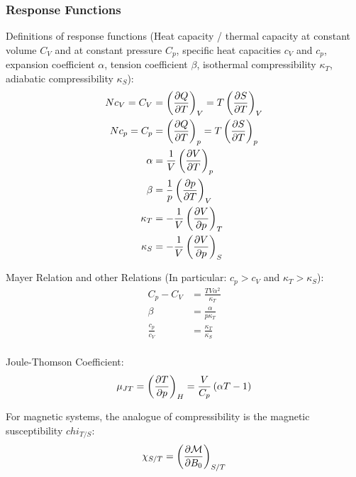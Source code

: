 		\subsubsection{Response Functions}
			\noindent
			Definitions of response functions (Heat capacity / thermal capacity at constant volume $C_V$ and at constant pressure $C_p$, specific heat capacities $c_V$ and $c_p$, expansion coefficient $\alpha$, tension coefficient $\beta$, isothermal compressibility $\kappa_T$, adiabatic compressibility $\kappa_S$):
			\begin{equation}
				\begin{aligned}
					N c_V = C_V &= \left( \pdv{Q}{T} \right)_V = T \left( \pdv{S}{T} \right)_V \\
					N c_p = C_p &= \left( \pdv{Q}{T} \right)_p = T \left( \pdv{S}{T} \right)_p \\
					\alpha &= \frac{1}{V} \left( \pdv{V}{T} \right)_p \\
					\beta &= \frac{1}{p} \left( \pdv{p}{T} \right)_V \\
					\kappa_T &= -\frac{1}{V} \left( \pdv{V}{p} \right)_T \\
					\kappa_S &= -\frac{1}{V} \left( \pdv{V}{p} \right)_S \\
				\end{aligned}
			\end{equation}

			\noindent
			Mayer Relation and other Relations  (In particular: $c_p > c_V$ and $\kappa_T > \kappa_S$):
			\begin{equation}
				\begin{aligned}
					C_p - C_V &= \frac{TV\alpha^2}{\kappa_T} \\
					\beta &= \frac{\alpha}{p \kappa_T} \\
					\frac{c_p}{c_V} &= \frac{\kappa_T}{\kappa_S} \\
				\end{aligned}
			\end{equation}

			\noindent
			Joule-Thomson Coefficient:
			\begin{equation}
				\mu_{JT} = \left( \pdv{T}{p} \right)_H = \frac{V}{C_p}\left(\alpha T - 1\right)
			\end{equation}

			\noindent
			For magnetic systems, the analogue of compressibility is the magnetic susceptibility $chi_{T/S}$:
			\begin{equation}
				\chi_{S/T} = \left(\pdv{\mathcal{M}}{B_0}\right)_{S/T}
			\end{equation}

